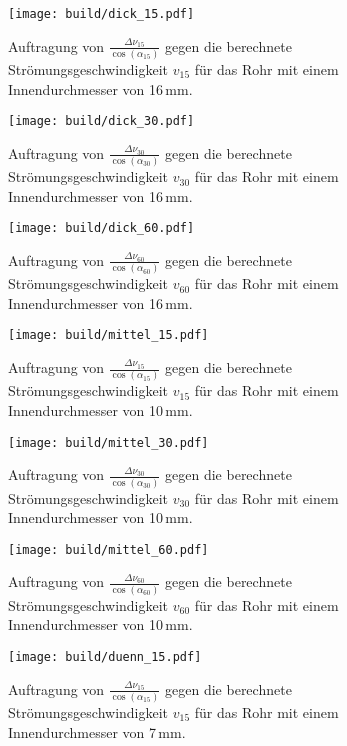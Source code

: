 \newpage
{}
\label{sec:Anhang}

\begin{figure}
  \centering
  \texttt{[image: build/dick\_15.pdf]}
  \caption{Auftragung von $\frac{\Delta \nu_{15}}{\cos(\alpha_{15})}$ gegen die berechnete
  Strömungsgeschwindigkeit $v_{15}$ für das Rohr mit einem Innendurchmesser von 16\,mm.}
  \label{fig:dick_15}
\end{figure}

\begin{figure}[h!]
  \centering
  \texttt{[image: build/dick\_30.pdf]}
  \caption{Auftragung von $\frac{\Delta \nu_{30}}{\cos(\alpha_{30})}$ gegen die berechnete
  Strömungsgeschwindigkeit $v_{30}$ für das Rohr mit einem Innendurchmesser von 16\,mm.}
  \label{fig:dick_30}
\end{figure}

\begin{figure}
  \centering
  \texttt{[image: build/dick\_60.pdf]}
  \caption{Auftragung von $\frac{\Delta \nu_{60}}{\cos(\alpha_{60})}$ gegen die berechnete
  Strömungsgeschwindigkeit $v_{60}$ für das Rohr mit einem Innendurchmesser von 16\,mm.}
  \label{fig:dick_60}
\end{figure}

\begin{figure}
  \centering
  \texttt{[image: build/mittel\_15.pdf]}
  \caption{Auftragung von $\frac{\Delta \nu_{15}}{\cos(\alpha_{15})}$ gegen die berechnete
  Strömungsgeschwindigkeit $v_{15}$ für das Rohr mit einem Innendurchmesser von 10\,mm.}
  \label{fig:mittel_15}
\end{figure}

\begin{figure}
  \centering
  \texttt{[image: build/mittel\_30.pdf]}
  \caption{Auftragung von $\frac{\Delta \nu_{30}}{\cos(\alpha_{30})}$ gegen die berechnete
  Strömungsgeschwindigkeit $v_{30}$ für das Rohr mit einem Innendurchmesser von 10\,mm.}
  \label{fig:mittel_30}
\end{figure}

\begin{figure}
  \centering
  \texttt{[image: build/mittel\_60.pdf]}
  \caption{Auftragung von $\frac{\Delta \nu_{60}}{\cos(\alpha_{60})}$ gegen die berechnete
  Strömungsgeschwindigkeit $v_{60}$ für das Rohr mit einem Innendurchmesser von 10\,mm.}
  \label{fig:mittel_60}
\end{figure}

\begin{figure}
  \centering
  \texttt{[image: build/duenn\_15.pdf]}
  \caption{Auftragung von $\frac{\Delta \nu_{15}}{\cos(\alpha_{15})}$ gegen die berechnete
  Strömungsgeschwindigkeit $v_{15}$ für das Rohr mit einem Innendurchmesser von 7\,mm.}
  \label{fig:duenn_15}
\end{figure}

